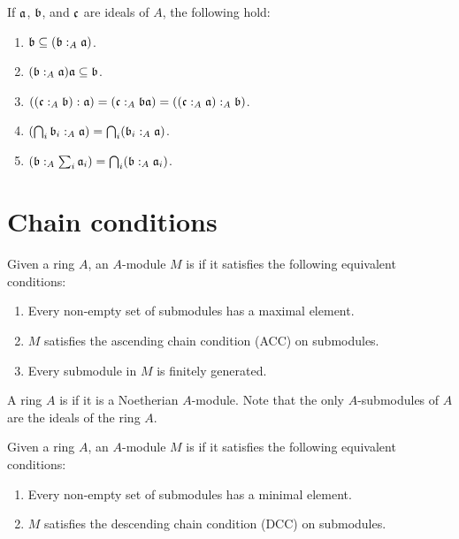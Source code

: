 \documentclass{ximera}
\begin{document}
\begin{proposition} If $\mathfrak{a}$, $\mathfrak{b}$, and $\mathfrak c$ are ideals of $A$, the following hold:
\begin{enumerate}
\item $\mathfrak{b}\subseteq (\mathfrak{b}:_A \mathfrak{a})$.
\item $(\mathfrak{b}:_A \mathfrak{a}) \mathfrak{a} \subseteq \mathfrak{b}$.
\item $((\mathfrak c:_A \mathfrak{b}) : \mathfrak{a})= (\mathfrak c :_A \mathfrak{b} \mathfrak{a}) = ((\mathfrak c :_A \mathfrak{a}):_A \mathfrak{b})$.
\item $\left(\bigcap_i \mathfrak{b}_i:_A \mathfrak{a}\right) = \bigcap_i(\mathfrak{b}_i:_A \mathfrak{a})$.
\item $\left(\mathfrak{b}:_A\sum_i \mathfrak{a}_i\right) = \bigcap_i(\mathfrak{b}:_A \mathfrak{a}_i)$.
\end{enumerate}
\end{proposition}



\section{Chain conditions}

\begin{definition} Given a ring $A$, an $A$-module $M$ is  if it satisfies the following equivalent conditions:
\begin{enumerate}
\item Every non-empty set of submodules has a maximal element.
\item $M$ satisfies the ascending chain condition (ACC) on submodules.
\item Every submodule in $M$ is finitely generated.
\end{enumerate}
\end{definition}

\begin{definition} A ring $A$ is  if it is a Noetherian $A$-module. Note that the only $A$-submodules of $A$ are the ideals of the ring $A$.
\end{definition}

\begin{definition} Given a ring $A$, an $A$-module $M$ is  if it satisfies the following equivalent conditions:
\begin{enumerate}
\item Every non-empty set of submodules has a minimal element.
\item $M$ satisfies the descending chain condition (DCC) on submodules.
\end{enumerate}
\end{definition}
\end{document}
